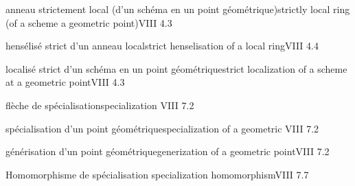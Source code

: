anneau strictement local (d'un schéma en un point géométrique)\quad strictly local ring (of a scheme  a geometric point)\quad VIII 4.3

hensélisé strict d'un anneau local\quad strict hens\deleted{\unsure{\'{}}}elisation of a local ring\quad VIII 4.4

localisé strict d'un schéma en un point géométrique\quad strict localization of a scheme at a geometric point\quad VIII 4.3

flèche de spécialisation\quad specialization \quad VIII 7.2

spécialisation d'un point géométrique\quad specialization of a geometric \quad VIII 7.2

générisation d'un point géométrique\quad generization of a geometric point\quad VIII 7.2


Homomorphisme de spécialisation\quad {} specialization homomorphism\quad VIII 7.7

